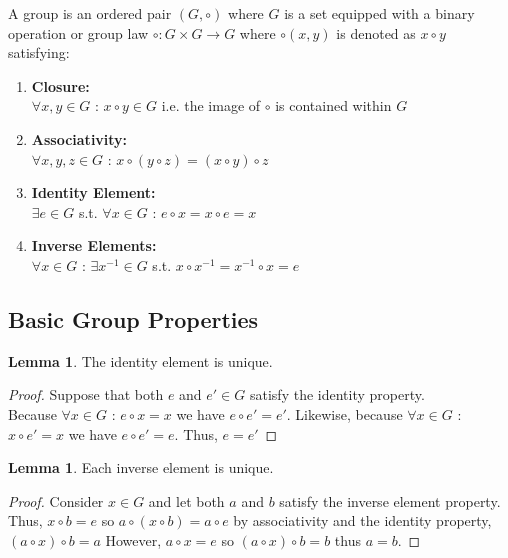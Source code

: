 \documentclass[12pt]{extarticle}
\renewcommand\qedsymbol{$\square$}
\theoremstyle{definition}
\newtheorem{lemma}[theorem]{Lemma}
\newenvironment{definition}[1][Definition:]{\begin{trivlist}
\item[\hskip \labelsep {\bfseries #1}]}{\end{trivlist}}
\newenvironment{lproof}{\begin{proof} \renewcommand{\qedsymbol}{}}{\end{proof}}
\begin{document}
\begin{definition}
A group is an ordered pair $(G, \circ)$ where $G$ is a set equipped with a binary operation or group law $\circ : G \times G \rightarrow G$ where $\circ(x,y)$ is denoted as $x \circ y$ satisfying:
\begin{enumerate}
\item \textbf{Closure:} \\ $\forall x,y \in G$ : $x \circ y \in G$ \: i.e. the image of $\circ$ is contained within $G$
\item \textbf{Associativity:} \\ $\forall x,y,z \in G$ : $x \circ (y \circ z) = (x \circ y) \circ z$
\item \textbf{Identity Element:} \\ $\exists e \in G$ s.t. $\forall x \in G$ : $e \circ x = x \circ e = x$
\item \textbf{Inverse Elements:} \\ $\forall x \in G$ : $\exists x^{-1} \in G$ s.t. $x \circ x^{-1} = x^{-1} \circ x = e$
\end{enumerate}
\end{definition}

\subsection{Basic Group Properties}

\begin{lemma}
The identity element is unique.
\end{lemma}

\begin{lproof}
Suppose that both $e$ and $e' \in G$ satisfy the identity property. \\ Because $\forall x \in G$ : $e \circ x = x$ we have $e \circ e' = e'$. Likewise, because $\forall x \in G$ : $x \circ e' = x$ we have $e \circ e' = e$. Thus, $e = e'$
\end{lproof}

\begin{lemma}
Each inverse element is unique.
\end{lemma}

\begin{lproof}
Consider $x \in G$ and let both $a$ and $b$ satisfy the inverse element property. Thus, $x \circ b = e$ so $a \circ (x \circ b) = a \circ e$ by associativity and the identity property, $(a \circ x) \circ b = a$ However, $a \circ x = e$ so $(a \circ x) \circ b = b$ thus $a = b$. 
\end{lproof}
\end{document}
